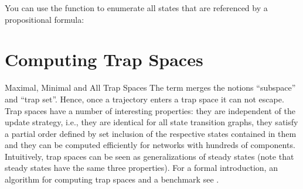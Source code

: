 \documentclass[letterpaper,10pt,english]{sphinxmanual}
\begin{document}
\begin{sphinxVerbatim}[commandchars=\\\{\}]
  \PYG{p}{[}\PYG{p}{]}
  
  
   
\end{sphinxVerbatim}

You can use the function {\hyperref[\detokenize{StateTransitionGraphs:list-states-referenced-by-proposition}]{}} to enumerate all states that are referenced by a propositional formula:

\begin{sphinxVerbatim}[commandchars=\\\{\}]
      
\end{sphinxVerbatim}


\section{Computing Trap Spaces}
\label{\detokenize{Manual:computing-trap-spaces}}
Maximal, Minimal and All Trap Spaces
The term  merges the notions “subspace” and “trap set”.
Hence, once a trajectory enters a trap space it can not escape.
Trap spaces have a number of interesting properties: they are independent of the update strategy, i.e.,
they are identical for all state transition graphs, they satisfy a partial order defined by set inclusion of the respective states contained in them
and they can be computed efficiently for networks with hundreds of components.
Intuitively, trap spaces can be seen as generalizations of steady states (note that steady states have the same three properties).
For a formal introduction, an algorithm for computing trap spaces and a benchmark see {\hyperref[\detokenize{Bibliography:klarner2015trap}]{}}.
\end{document}
